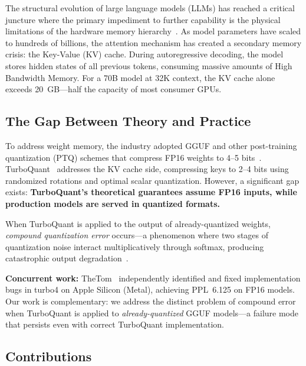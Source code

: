 \documentclass[11pt]{article}
\begin{document}
The structural evolution of large language models (LLMs) has reached a critical juncture where the primary impediment to further capability is the physical limitations of the hardware memory hierarchy~\citep{google2026turboquant}. As model parameters have scaled to hundreds of billions, the attention mechanism has created a secondary memory crisis: the Key-Value (KV) cache. During autoregressive decoding, the model stores hidden states of all previous tokens, consuming massive amounts of High Bandwidth Memory. For a 70B model at 32K context, the KV cache alone exceeds 20~GB---half the capacity of most consumer GPUs.

\subsection{The Gap Between Theory and Practice}

To address weight memory, the industry adopted GGUF and other post-training quantization (PTQ) schemes that compress FP16 weights to 4--5 bits~\citep{gguf}. TurboQuant~\citep{zandieh2026turboquant} addresses the KV cache side, compressing keys to 2--4 bits using randomized rotations and optimal scalar quantization. However, a significant gap exists: \textbf{TurboQuant's theoretical guarantees assume FP16 inputs, while production models are served in quantized formats.}

When TurboQuant is applied to the output of already-quantized weights, \emph{compound quantization error} occurs---a phenomenon where two stages of quantization noise interact multiplicatively through softmax, producing catastrophic output degradation~\citep{bondarenko2023softmax, wkvquant}.

\textbf{Concurrent work:} TheTom~\citep{theTom2026turbo4} independently identified and fixed implementation bugs in turbo4 on Apple Silicon (Metal), achieving PPL~6.125 on FP16 models. Our work is complementary: we address the distinct problem of compound error when TurboQuant is applied to \emph{already-quantized} GGUF models---a failure mode that persists even with correct TurboQuant implementation.

\subsection{Contributions}
\end{document}
